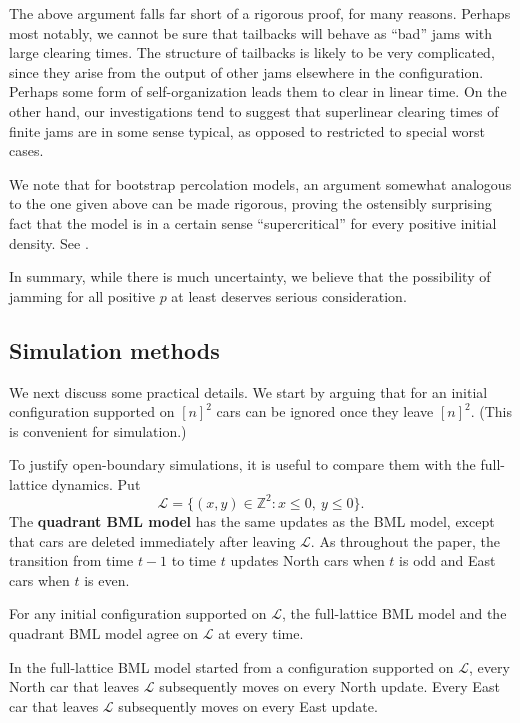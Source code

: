 \documentclass[reqno]{amsart}
\begin{document}
The above argument falls far short of a rigorous proof, for many reasons.  Perhaps most notably, we cannot be sure that tailbacks will behave as ``bad'' jams with large clearing times.  The structure of tailbacks is likely to be very complicated, since they arise from the output of other jams elsewhere in the configuration.  Perhaps some form of self-organization leads them to clear in linear time.  On the other hand, our investigations tend to suggest that superlinear clearing times of finite jams are in some sense typical, as opposed to restricted to special worst cases.

We note that for bootstrap percolation models, an argument somewhat analogous to the one given above can be made rigorous, proving the ostensibly surprising fact that the model is in a certain sense ``supercritical'' for every positive initial density. See \cite{vanenter,schonmann}.

In summary, while there is much uncertainty, we believe that the possibility of jamming for all positive $p$ at least deserves serious consideration.

\subsection*{Simulation methods}
We next discuss some practical details. We start by arguing that for an initial configuration supported on $[n]^2$ cars can be ignored once they leave $[n]^2$. (This is convenient for simulation.)

To justify open-boundary simulations, it is useful to compare them with the
full-lattice dynamics. Put
\[
 \mathcal L=\{(x,y)\in\mathbb Z^2:x\leq0,\ y\leq0\}.
\]
The \textbf{quadrant BML model} has the same updates as the BML model, except
that cars are deleted immediately after leaving $\mathcal L$. As throughout
the paper, the transition from time $t-1$ to time $t$ updates North cars when
$t$ is odd and East cars when $t$ is even.

\begin{proposition}\label{prop:cars_leaving_dont_matter}
For any initial configuration supported on $\mathcal L$, the full-lattice BML
model and the quadrant BML model agree on $\mathcal L$ at every time.
\end{proposition}

\begin{lemma}\label{lem:free_flowing}
In the full-lattice BML model started from a configuration supported on
$\mathcal L$, every North car that leaves $\mathcal L$ subsequently moves on
every North update. Every East car that leaves $\mathcal L$ subsequently
moves on every East update.
\end{lemma}
\end{document}
